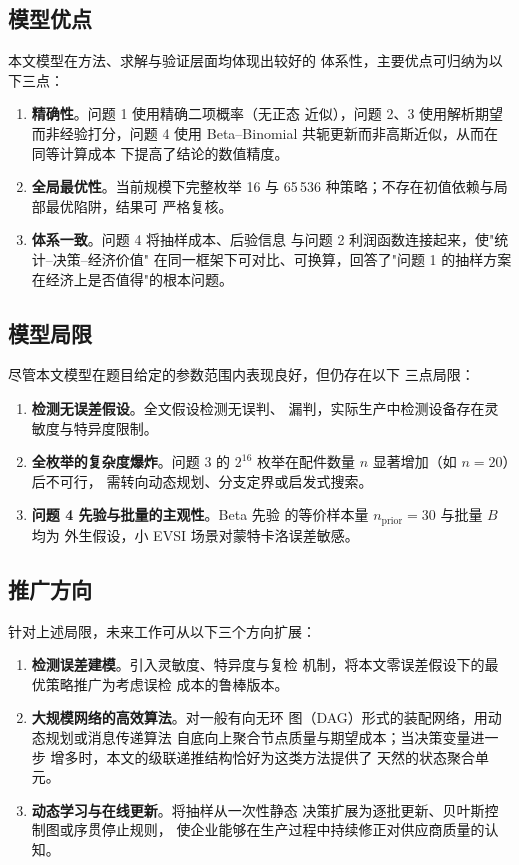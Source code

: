 \documentclass[withoutpreface,bwprint]{cumcmthesis}
\begin{document}
\subsection{模型优点}

本文模型在方法、求解与验证层面均体现出较好的
体系性，主要优点可归纳为以下三点：

\begin{enumerate}
    \item \textbf{精确性}。问题 1 使用精确二项概率（无正态
    近似），问题 2、3 使用解析期望而非经验打分，问题 4 使用
    Beta--Binomial 共轭更新而非高斯近似，从而在同等计算成本
    下提高了结论的数值精度。
    \item \textbf{全局最优性}。当前规模下完整枚举 16 与
    65\,536 种策略；不存在初值依赖与局部最优陷阱，结果可
    严格复核。
    \item \textbf{体系一致}。问题 4 将抽样成本、后验信息
    与问题 2 利润函数连接起来，使"统计--决策--经济价值"
    在同一框架下可对比、可换算，回答了"问题 1 的抽样方案
    在经济上是否值得"的根本问题。
\end{enumerate}

\subsection{模型局限}

尽管本文模型在题目给定的参数范围内表现良好，但仍存在以下
三点局限：

\begin{enumerate}
    \item \textbf{检测无误差假设}。全文假设检测无误判、
    漏判，实际生产中检测设备存在灵敏度与特异度限制。
    \item \textbf{全枚举的复杂度爆炸}。问题 3 的 $2^{16}$
    枚举在配件数量 $n$ 显著增加（如 $n = 20$）后不可行，
    需转向动态规划、分支定界或启发式搜索。
    \item \textbf{问题 4 先验与批量的主观性}。Beta 先验
    的等价样本量 $n_{\mathrm{prior}} = 30$ 与批量 $B$ 均为
    外生假设，小 EVSI 场景对蒙特卡洛误差敏感。
\end{enumerate}

\subsection{推广方向}

针对上述局限，未来工作可从以下三个方向扩展：

\begin{enumerate}
    \item \textbf{检测误差建模}。引入灵敏度、特异度与复检
    机制，将本文零误差假设下的最优策略推广为考虑误检
    成本的鲁棒版本。
    \item \textbf{大规模网络的高效算法}。对一般有向无环
    图（DAG）形式的装配网络，用动态规划或消息传递算法
    自底向上聚合节点质量与期望成本；当决策变量进一步
    增多时，本文的级联递推结构恰好为这类方法提供了
    天然的状态聚合单元。
    \item \textbf{动态学习与在线更新}。将抽样从一次性静态
    决策扩展为逐批更新、贝叶斯控制图或序贯停止规则，
    使企业能够在生产过程中持续修正对供应商质量的认知。
\end{enumerate}
\end{document}
